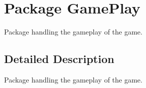 \hypertarget{namespace_game_play}{\section{Package Game\-Play}
\label{namespace_game_play}
}


Package handling the gameplay of the game.  




\subsection{Detailed Description}
Package handling the gameplay of the game. 